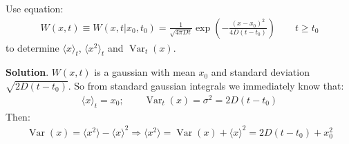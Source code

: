 \documentclass[../template.tex]{subfiles}
\begin{document}
\begin{exo}
    Use equation:
    \begin{align*}
        W(x,t) \equiv W(x,t|x_0, t_0) = \frac{1}{\sqrt{4 \pi D t}} \exp\left(-\frac{(x-x_0)^2}{4 D (t-t_0)} \right) \qquad t\geq t_0  
    \end{align*}
    to determine $\langle x \rangle_t$, $\langle x^2 \rangle_t$ and $\operatorname{Var}_t(x)$.   
    
    \medskip

    \textbf{Solution}. $W(x,t)$ is a gaussian with mean $x_0$ and standard deviation $\sqrt{2D(t-t_0)}$. So from standard gaussian integrals we immediately know that:
    \begin{align*}
        \langle x \rangle_t = x_0; \qquad \operatorname{Var}_t(x) = \sigma^2 = 2D(t-t_0) 
    \end{align*}
    Then:
    \begin{align*}
        \operatorname{Var}(x) = \langle x^2 \rangle  - \langle x \rangle^2 \Rightarrow \langle x^2 \rangle = \operatorname{Var}(x) + \langle x \rangle^2 = 2D(t-t_0) + x_0^2
    \end{align*}
\end{exo}
\end{document}
